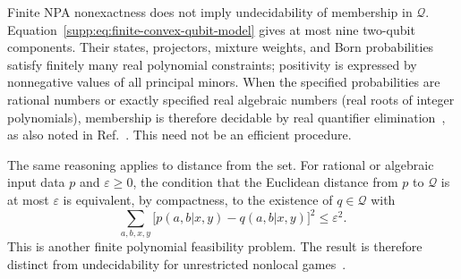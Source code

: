 \documentclass[aps,prl,onecolumn,10pt,superscriptaddress,nofootinbib,longbibliography]{revtex4-2}
\theoremstyle{remark}
\newcommand{\Q}{\mathcal Q}
\begin{document}
Finite NPA nonexactness does not imply undecidability of membership in $\Q$. Equation~\eqref{supp:eq:finite-convex-qubit-model} gives at most nine two-qubit components. Their states, projectors, mixture weights, and Born probabilities satisfy finitely many real polynomial constraints; positivity is expressed by nonnegative values of all principal minors. When the specified probabilities are rational numbers or exactly specified real algebraic numbers (real roots of integer polynomials), membership is therefore decidable by real quantifier elimination~\cite{Tarski1951}, as also noted in Ref.~\cite{Masanes2005}. This need not be an efficient procedure.

The same reasoning applies to distance from the set. For rational or algebraic input data $p$ and $\varepsilon\geq0$, the condition that the Euclidean distance from $p$ to $\Q$ is at most $\varepsilon$ is equivalent, by compactness, to the existence of $q\in\Q$ with
\begin{equation}
\sum_{a,b,x,y}\bigl[p(a,b|x,y)-q(a,b|x,y)\bigr]^2\leq\varepsilon^2.
\label{supp:eq:distance-decision}
\end{equation}
This is another finite polynomial feasibility problem. The result is therefore distinct from undecidability for unrestricted nonlocal games~\cite{MIPstarRE}.
\end{document}
